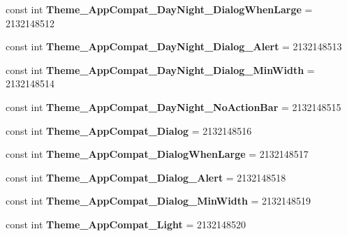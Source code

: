 \begin{DoxyCompactItemize}
const int {\bfseries Theme\+\_\+\+App\+Compat\+\_\+\+Day\+Night\+\_\+\+Dialog\+When\+Large} = 2132148512
\item 
\mbox{\label{classst_delivery_1_1_resource_1_1_style_ab1570f92d848b2b8b8a5d1a5466ad2bb}} 
const int {\bfseries Theme\+\_\+\+App\+Compat\+\_\+\+Day\+Night\+\_\+\+Dialog\+\_\+\+Alert} = 2132148513
\item 
\mbox{\label{classst_delivery_1_1_resource_1_1_style_ab6185ad2640179d869cdf39c53cc35f8}} 
const int {\bfseries Theme\+\_\+\+App\+Compat\+\_\+\+Day\+Night\+\_\+\+Dialog\+\_\+\+Min\+Width} = 2132148514
\item 
\mbox{\label{classst_delivery_1_1_resource_1_1_style_acfd9550a1312e5fe571d25eff07d1484}} 
const int {\bfseries Theme\+\_\+\+App\+Compat\+\_\+\+Day\+Night\+\_\+\+No\+Action\+Bar} = 2132148515
\item 
\mbox{\label{classst_delivery_1_1_resource_1_1_style_ab3b22a28de26e5a0a7002c7a835ce81e}} 
const int {\bfseries Theme\+\_\+\+App\+Compat\+\_\+\+Dialog} = 2132148516
\item 
\mbox{\label{classst_delivery_1_1_resource_1_1_style_a5c9726bad70447401e64b23f86077d3c}} 
const int {\bfseries Theme\+\_\+\+App\+Compat\+\_\+\+Dialog\+When\+Large} = 2132148517
\item 
\mbox{\label{classst_delivery_1_1_resource_1_1_style_a215b0fef2cb43150b8ad5c1f8fbb6668}} 
const int {\bfseries Theme\+\_\+\+App\+Compat\+\_\+\+Dialog\+\_\+\+Alert} = 2132148518
\item 
\mbox{\label{classst_delivery_1_1_resource_1_1_style_a21f947c75894bfad8f430f1052c42980}} 
const int {\bfseries Theme\+\_\+\+App\+Compat\+\_\+\+Dialog\+\_\+\+Min\+Width} = 2132148519
\item 
\mbox{\label{classst_delivery_1_1_resource_1_1_style_a4273e97cee7c856d9b19948d8782db73}} 
const int {\bfseries Theme\+\_\+\+App\+Compat\+\_\+\+Light} = 2132148520

\end{DoxyCompactItemize}
